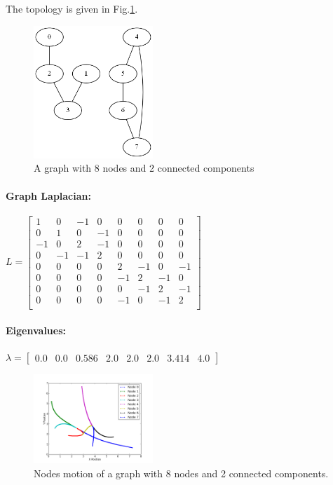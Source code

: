 \documentclass[12pt]{article}
\begin{document}
The topology is given in Fig.\ref{fig:C5}. 
\begin{figure}[htbp]
\centering
\includegraphics[width=0.4\textwidth]{./C5}
\caption{A graph with 8 nodes and 2 connected components}
\label{fig:C5}
\end{figure}

\paragraph{\textbf{Graph Laplacian:}}

$
L = 
\begin{bmatrix}
1 & 0 & -1 & 0 & 0 & 0 & 0 & 0 \\
0 & 1 & 0 & -1 & 0 & 0 & 0 & 0 \\
-1 & 0 & 2 & -1 & 0 & 0 & 0 & 0 \\
0 & -1 & -1 & 2 & 0 & 0 & 0 & 0 \\
0 & 0 & 0 & 0 & 2 & -1 & 0 & -1 \\
0 & 0 & 0 & 0 & -1 & 2 & -1 & 0 \\
0 & 0 & 0 & 0 & 0 & -1 & 2 & -1 \\
0 & 0 & 0 & 0 & -1 & 0 & -1 & 2 \\

\end{bmatrix}
$

\paragraph{\textbf{Eigenvalues:}}

$
\lambda = 
\begin{bmatrix}
0.0 & 0.0 & 0.586 & 2.0 & 2.0 & 2.0 & 3.414 & 4.0 
\end{bmatrix}
$

\begin{figure}[htbp]
\centering
\includegraphics[width=0.4\textwidth]{./C5_mo}
\caption{Nodes motion of a graph with 8 nodes and 2 connected components.}
\label{fig:C5_mo}
\end{figure}
\end{document}
